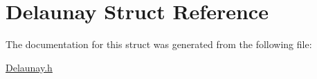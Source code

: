\hypertarget{structDelaunay}{
\section{Delaunay Struct Reference}
\label{structDelaunay}
}


The documentation for this struct was generated from the following file:\begin{DoxyCompactItemize}
\item 
\hyperlink{Delaunay_8h}{Delaunay.h}\end{DoxyCompactItemize}
